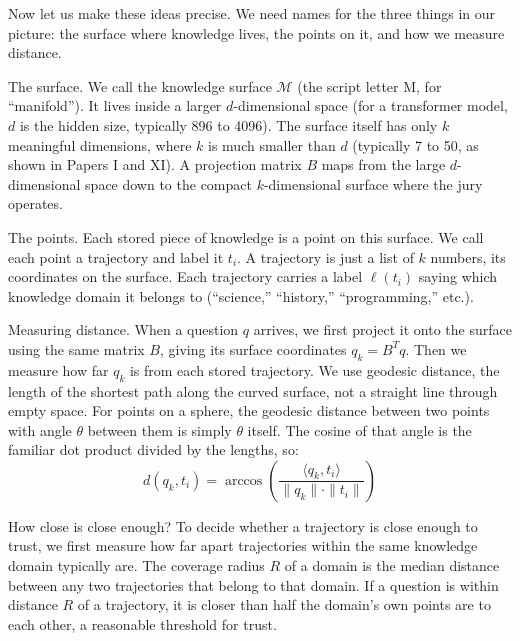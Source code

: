 \documentclass[11pt]{article}
\begin{document}
Now let us make these ideas precise. We need names for the three things in our
picture: the surface where knowledge lives, the points on it, and how we measure
distance.

The surface. We call the knowledge surface $\mathcal{M}$ (the script
letter M, for ``manifold''). It lives inside a larger $d$-dimensional space (for
a transformer model, $d$ is the hidden size, typically 896 to 4096). The
surface itself has only $k$ meaningful dimensions, where $k$ is much smaller
than $d$ (typically 7 to 50, as shown in Papers I and XI). A projection matrix
$B$ maps from the large $d$-dimensional space down to the compact $k$-dimensional
surface where the jury operates.

The points. Each stored piece of knowledge is a point on this surface.
We call each point a trajectory and label it $t_i$. A trajectory is
just a list of $k$ numbers, its coordinates on the surface. Each trajectory
carries a label $\ell(t_i)$ saying which knowledge domain it belongs to
(``science,'' ``history,'' ``programming,'' etc.).

Measuring distance. When a question $q$ arrives, we first project it
onto the surface using the same matrix $B$, giving its surface coordinates
$q_k = B^T q$. Then we measure how far $q_k$ is from each stored trajectory.
We use geodesic distance, the length of the shortest path along the curved
surface, not a straight line through empty space. For points on a sphere, the
geodesic distance between two points with angle $\theta$ between them is simply
$\theta$ itself. The cosine of that angle is the familiar dot product divided by
the lengths, so:
\begin{equation}
d(q_k, t_i) = \arccos\left(\frac{\langle q_k, t_i \rangle}{\|q_k\| \cdot \|t_i\|}\right)
\end{equation}

How close is close enough? To decide whether a trajectory is close
enough to trust, we first measure how far apart trajectories within the same
knowledge domain typically are. The coverage radius $R$ of a domain is
the median distance between any two trajectories that belong to that domain.
If a question is within distance $R$ of a trajectory, it is closer than half
the domain's own points are to each other, a reasonable threshold for trust.
\end{document}
